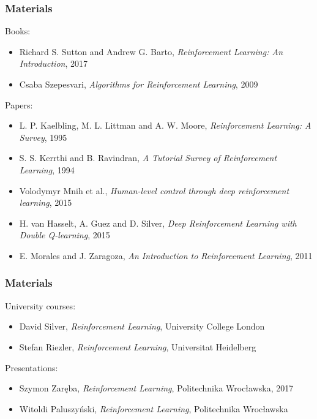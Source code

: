 \begin{frame}
  \frametitle{Materials}

  Books:
  \begin{itemize}
    \item{Richard S. Sutton and Andrew G. Barto, \textit{Reinforcement Learning: An Introduction}, 2017}
    \item{Csaba Szepesvari, \textit{Algorithms for Reinforcement Learning}, 2009}
  \end{itemize}

  Papers:
  \begin{itemize}
    \item{L. P. Kaelbling, M. L. Littman and A. W. Moore, \textit{Reinforcement Learning: A Survey}, 1995}
    \item{S. S. Kerrthi and B. Ravindran, \textit{A Tutorial Survey of Reinforcement Learning}, 1994}
    \item{Volodymyr Mnih et al., \textit{Human-level control through deep reinforcement learning}, 2015}
    \item{H. van Hasselt, A. Guez and D. Silver, \textit{Deep Reinforcement Learning with Double Q-learning}, 2015}
    \item{E. Morales and J. Zaragoza, \textit{An Introduction to Reinforcement Learning}, 2011}
  \end{itemize}
\end{frame}

\begin{frame}
  \frametitle{Materials}
  University courses:
  \begin{itemize}
    \item{David Silver, \textit{Reinforcement Learning}, University College London}
    \item{Stefan Riezler, \textit{Reinforcement Learning}, Universitat Heidelberg}
  \end{itemize}

  Presentations:
  \begin{itemize}
    \item{Szymon Zaręba, \textit{Reinforcement Learning}, Politechnika Wrocławska, 2017}
    \item{Witoldi Paluszyński, \textit{Reinforcement Learning}, Politechnika Wrocławska}
  \end{itemize}

\end{frame}
